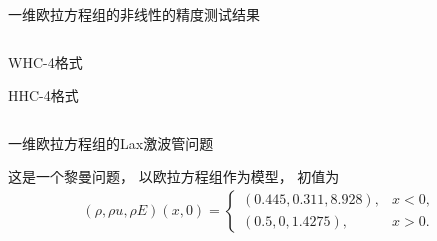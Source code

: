 \documentclass[aspectratio=169]{beamer}
\begin{document}
\begin{frame}{一维欧拉方程组的非线性的精度测试结果}
  
  \vspace{-3mm}
  \begin{columns}
    \begin{column}{0.2\textwidth}
      
      \centering
      
      WHC-4格式
      
      \vspace{0.4\textheight}
      
      HHC-4格式
      
    \end{column}
    \begin{column}{0.8\textwidth}
      \begin{small}
        
      \end{small}
    \end{column}
  \end{columns}
  
\end{frame}




\begin{frame}{一维欧拉方程组的Lax激波管问题}
  
  \begin{example}[一维欧拉方程组的Lax激波管问题]
    \label{ex:lax}
    这是一个黎曼问题，
    以欧拉方程组作为模型，
    初值为
    \begin{equation*}
      \begin{aligned}
        (\rho,\rho u,\rho E)(x,0)=
        \begin{cases}
          (0.445,0.311,8.928), & x<0,  \\
          (0.5,0,1.4275),      & x>0.
        \end{cases}
      \end{aligned}
    \end{equation*}
  \end{example}
  
\end{frame}
\end{document}
